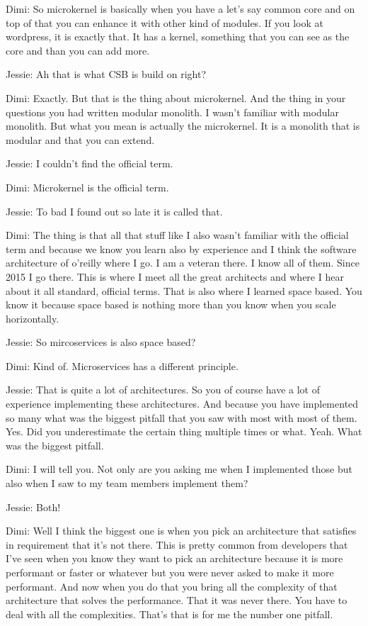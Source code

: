 Dimi: So microkernel is basically when you have a let's say common core and on top of that you can enhance it with other kind of modules. If you look at wordpress, it is exactly that. It has a kernel, something that you can see as the core and than you can add more.

Jessie: Ah that is what CSB is build on right?

Dimi: Exactly. But that is the thing about microkernel. And the thing in your questions you had written modular monolith. I wasn't familiar with modular monolith. But what you mean is actually the microkernel. It is a monolith that is modular and that you can extend.

Jessie: I couldn't find the official term.

Dimi: Microkernel is the official term.

Jessie: To bad I found out so late it is called that.

Dimi: The thing is that all that stuff like I also wasn't familiar with the official term and because we know you learn also by experience and I think the software architecture of o'reilly where I go. I am a veteran there. I know all of them. Since 2015 I go there. This is where I meet all the great architects and where I hear about it all standard, official terms. That is also where I learned space based. You know it because space based is nothing more than you know when you scale horizontally.

Jessie: So mircoservices is also space based?

Dimi: Kind of. Microservices has a different principle.

Jessie: That is quite a lot of architectures. So you of course have a lot of experience implementing these architectures. And because you have implemented so many what was the biggest pitfall that you saw with most with most of them. Yes. Did you underestimate the certain thing multiple times or what. Yeah. What was the biggest pitfall.

Dimi: I will tell you. Not only are you asking me when I implemented those but also when I saw to my team members implement them?

Jessie: Both!

Dimi: Well I think the biggest one is when you pick an architecture that satisfies in requirement that it's not there. This is pretty common from developers that I've seen when you know they want to pick an architecture because it is more performant or faster or whatever but you were never asked to make it more performant. And now when you do that you bring all the complexity of that architecture that solves the performance. That it was never there. You have to deal with all the complexities. That's that is for me the number one pitfall.

